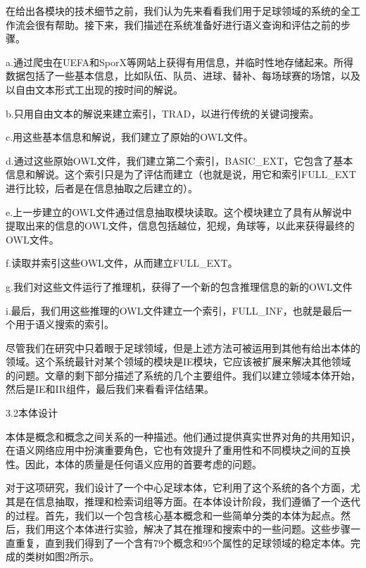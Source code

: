 在给出各模块的技术细节之前，我们认为先来看看我们用于足球领域的系统的全工作流会很有帮助。接下来，我们描述在系统准备好进行语义查询和评估之前的步骤。

{\Times a}.通过爬虫在{\Times UEFA}和{\Times SporX}等网站上获得有用信息，并临时性地存储起来。所得数据包括了一些基本信息，比如队伍、队员、进球、替补、每场球赛的场馆，以及以自由文本形式工出现的按时间的解说。

{\Times b}.只用自由文本的解说来建立索引，{\Times TRAD}，以进行传统的关键词搜索。

{\Times c}.用这些基本信息和解说，我们建立了原始的{\Times OWL}文件。

{\Times d}.通过这些原始{\Times OWL}文件，我们建立第二个索引，{\Times BASIC\_EXT}，它包含了基本信息和解说。这个索引只是为了评估而建立（也就是说，用它和索引{\Times FULL\_EXT} 进行比较，后者是在信息抽取之后建立的）。 

{\Times e}.上一步建立的{\Times OWL}文件通过信息抽取模块读取。这个模块建立了具有从解说中提取出来的信息的{\Times OWL}文件，信息包括越位，犯规，角球等，以此来获得最终的{\Times OWL}文件。

{\Times f}.读取并索引这些{\Times OWL}文件，从而建立{\Times FULL\_EXT}。

{\Times g}.我们对这些文件运行了推理机，获得了一个新的包含推理信息的新的{\Times OWL}文件

{\Times i}.最后，我们用这些推理的{\Times OWL}文件建立一个索引，{\Times FULL\_INF}，也就是最后一个用于语义搜索的索引。

尽管我们在研究中只着眼于足球领域，但是上述方法可被运用到其他有给出本体的领域。这个系统最针对某个领域的模块是{\Times IE}模块，它应该被扩展来解决其他领域的问题。文章的剩下部分描述了系统的几个主要组件。我们以建立领域本体开始，然后是{\Times IE}和{\Times IR}组件，最后我们来看看评估结果。

3.2本体设计

本体是概念和概念之间关系的一种描述。他们通过提供真实世界对角的共用知识，在语义网络应用中扮演重要角色，它也有效提升了重用性和不同模块之间的互换性。因此，本体的质量是任何语义应用的首要考虑的问题。

对于这项研究，我们设计了一个中心足球本体，它利用了这个系统的各个方面，尤其是在信息抽取，推理和检索词组等方面。在本体设计阶段，我们遵循了一个迭代的过程。首先，我们以一个包含核心基本概念和一些简单分类的本体为起点。然后，我们用这个本体进行实验，解决了其在推理和搜索中的一些问题。这些步骤一直重复，直到我们得到了一个含有79个概念和95个属性的足球领域的稳定本体。完成的类树如图2所示。

